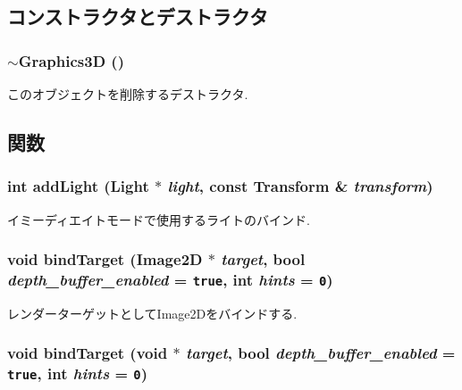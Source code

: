 \subsection{コンストラクタとデストラクタ}
\hypertarget{classm3g_1_1Graphics3D_9b9347476fc10e57b31694ac8a628511}{
\subsubsection[{$\sim$Graphics3D}]{\setlength{\rightskip}{0pt plus 5cm}$\sim${\bf Graphics3D} ()}}
\label{classm3g_1_1Graphics3D_9b9347476fc10e57b31694ac8a628511}


このオブジェクトを削除するデストラクタ. 

\subsection{関数}
\hypertarget{classm3g_1_1Graphics3D_0a8acc61618bad17053cb62131819b92}{
\subsubsection[{addLight}]{\setlength{\rightskip}{0pt plus 5cm}int addLight ({\bf Light} $\ast$ {\em light}, \/  const {\bf Transform} \& {\em transform})}}
\label{classm3g_1_1Graphics3D_0a8acc61618bad17053cb62131819b92}


イミーディエイトモードで使用するライトのバインド. \hypertarget{classm3g_1_1Graphics3D_b775163cbe39d177e255011e381cd9f8}{
\subsubsection[{bindTarget}]{\setlength{\rightskip}{0pt plus 5cm}void bindTarget ({\bf Image2D} $\ast$ {\em target}, \/  bool {\em depth\_\-buffer\_\-enabled} = {\tt true}, \/  int {\em hints} = {\tt 0})}}
\label{classm3g_1_1Graphics3D_b775163cbe39d177e255011e381cd9f8}


レンダーターゲットとしてImage2Dをバインドする. \hypertarget{classm3g_1_1Graphics3D_d34fb1ab11f2e25b98b93affd71dcc05}{
\subsubsection[{bindTarget}]{\setlength{\rightskip}{0pt plus 5cm}void bindTarget (void $\ast$ {\em target}, \/  bool {\em depth\_\-buffer\_\-enabled} = {\tt true}, \/  int {\em hints} = {\tt 0})}}
\label{classm3g_1_1Graphics3D_d34fb1ab11f2e25b98b93affd71dcc05}


